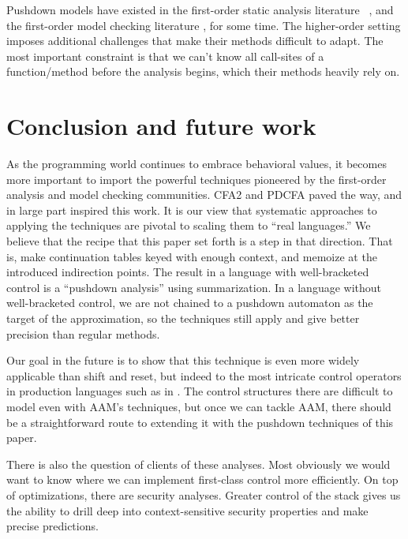 \documentclass{llncs}
\begin{document}
Pushdown models have existed in the first-order static analysis
literature ~\citep[Chapter
7]{local:muchnick:jones:flow-analysis:1981}\citep{ianjohnson:reps:pushdown:1995},
and the first-order model checking literature
\citep{ianjohnson:bouajiani:esparza:pushdown:1997}, for some time. The
higher-order setting imposes additional challenges that make their
methods difficult to adapt. The most important constraint is that we
can't know all call-sites of a function/method before the analysis
begins, which their methods heavily rely on.

\section{Conclusion and future work}

As the programming world continues to embrace behavioral values, it
becomes more important to import the powerful techniques pioneered by
the first-order analysis and model checking communities. CFA2 and
PDCFA paved the way, and in large part inspired this work. It is our
view that systematic approaches to applying the techniques are pivotal
to scaling them to ``real languages.'' We believe that the recipe that
this paper set forth is a step in that direction. That is, make
continuation tables keyed with enough context, and memoize at the
introduced indirection points. The result in a language with
well-bracketed control is a ``pushdown analysis'' using
summarization. In a language without well-bracketed control, we are
not chained to a pushdown automaton as the target of the
approximation, so the techniques still apply and give better precision
than regular methods.

Our goal in the future is to show that this technique is even more
widely applicable than shift and reset, but indeed to the most
intricate control operators in production languages such as in
\citet{ianjohnson:Flatt:2007:ADC:1291151.1291178}. The control
structures there are difficult to model even with AAM's techniques,
but once we can tackle AAM, there should be a straightforward route to
extending it with the pushdown techniques of this paper.

There is also the question of clients of these analyses. Most
obviously we would want to know where we can implement first-class
control more efficiently. On top of optimizations, there are security
analyses. Greater control of the stack gives us the ability to drill
deep into context-sensitive security properties and make precise
predictions.



\end{document}
